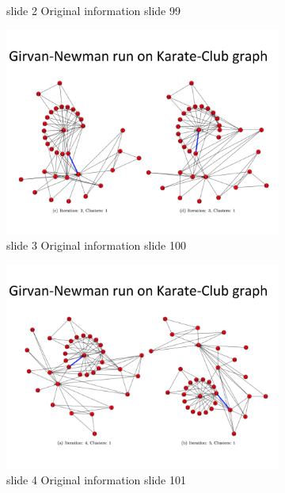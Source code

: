 \documentclass[10pt,letterpaper]{article}
\begin{document}
\begin{figure}[H]
\begin{subfigure}[b]{0.4\linewidth}
     \caption{slide 2 Original information slide 99}
  \end{subfigure}
  \begin{subfigure}[b]{0.4\linewidth}
     \includegraphics[width=\linewidth]{slide100.png} 
     \caption{slide 3 Original information slide 100}
  \end{subfigure}
  \begin{subfigure}[b]{0.4\linewidth}
     \includegraphics[width=\linewidth]{slide101.png} 
     \caption{slide 4 Original information slide 101}
  \end{subfigure}
  \begin{subfigure}[b]{0.4\linewidth}

\end{subfigure}
\end{figure}
\end{document}
